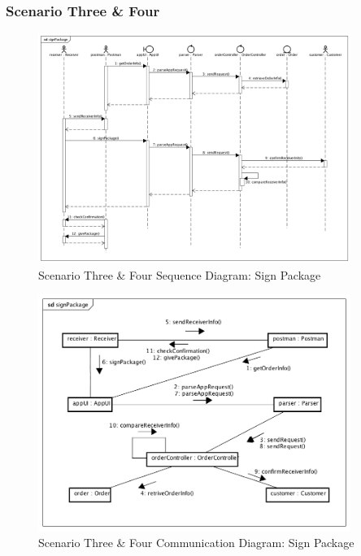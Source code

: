 \documentclass[12pt]{scrreprt}
\begin{document}
\subsubsection{Scenario Three \& Four}
\begin{figure}[H]
  \centering\includegraphics[width=4in]{DocumentRes/34SequenceDiagram_signPackage.png}
  \caption{Scenario Three \& Four Sequence Diagram: Sign Package}
\end{figure}
\begin{figure}[H]
  \centering\includegraphics[width=4in]{DocumentRes/34CommunicationDiagram_signPackage.png}
  \caption{Scenario Three \& Four Communication Diagram: Sign Package}
\end{figure}
\end{document}
